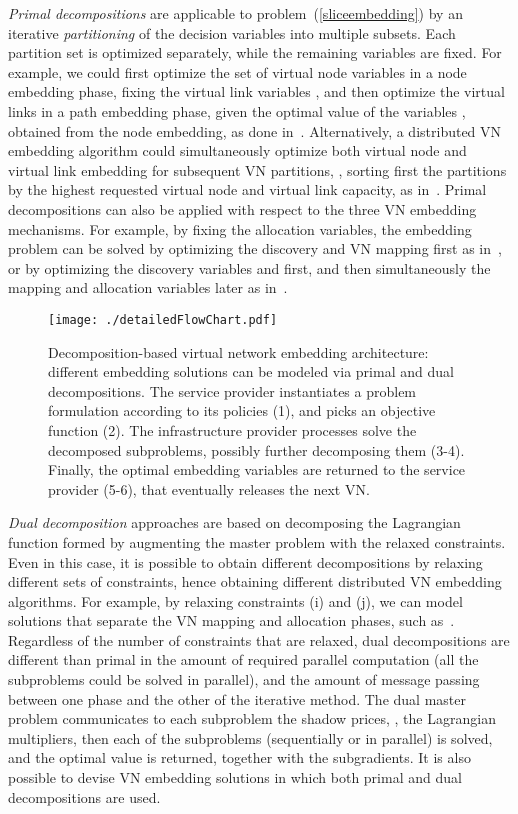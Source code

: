 \documentclass[a4paper, 10pt, conference]{ieeeconf}
\begin{document}
{\it Primal decompositions} are applicable to problem~(\ref{sliceembedding}) by an iterative {\it partitioning} of the decision variables into multiple subsets. Each partition set is optimized separately, while the remaining variables are fixed.
For example, we could first optimize the set of virtual node variables  in a node embedding phase, fixing the virtual link variables , and then optimize the virtual links in a path embedding phase, given the optimal value of the variables , obtained from the node embedding, as done in~\cite{CAD,pathsplitting}.
Alternatively, a distributed VN embedding algorithm could simultaneously optimize both virtual node and virtual link embedding for subsequent VN partitions, , sorting first the partitions by the highest requested virtual node and virtual link capacity, as in~\cite{Houidi-distributedVNM}.
Primal decompositions can also be applied with respect to the three VN embedding mechanisms. For example, by fixing the allocation variables, the embedding problem can be solved by optimizing the discovery and VN mapping first as in~\cite{Polyvine}, or by optimizing the discovery variables  and   first, and then simultaneously the mapping and allocation variables later as in~\cite{sword}.


\begin{figure}[t!]
\centering
\texttt{[image: ./detailedFlowChart.pdf]}
\caption{Decomposition-based virtual network embedding architecture: different embedding solutions can be modeled via primal and dual decompositions. The service provider instantiates a problem formulation according to its policies (1),
and picks an objective function  (2). The infrastructure provider processes solve the decomposed subproblems, possibly further decomposing them (3-4). Finally, the optimal embedding variables are returned to the service provider (5-6), that eventually releases the next VN.}
\label{fig:architecture}
\vspace{-5mm}
\end{figure}


{\it Dual decomposition} approaches are based on decomposing the Lagrangian function formed by augmenting the master problem with the relaxed constraints.
Even in this case, it is possible to obtain different decompositions by relaxing different sets of constraints, hence obtaining different distributed VN embedding algorithms.  For example, by relaxing constraints  
(i) and (j), we can model solutions that separate the VN mapping and allocation phases, such as~\cite{SHARP,bellagio}.
Regardless of the number of constraints that are relaxed,   dual decompositions are different than primal in the amount of required parallel computation (all the subproblems could be solved in parallel), and the amount of message passing between one phase and the other of the iterative method. The dual master problem communicates to each subproblem the shadow prices, , the Lagrangian multipliers, then each of the subproblems (sequentially or in parallel) is solved, and  the optimal value is returned, together with the subgradients. 
It is also possible to devise VN embedding solutions in which both primal and dual decompositions are used. 
\end{document}
